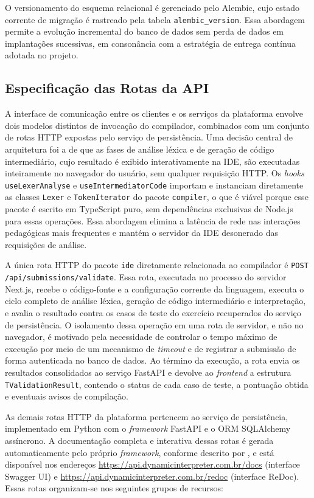 O versionamento do esquema relacional é gerenciado pelo Alembic, cujo estado corrente de migração é rastreado pela tabela \texttt{alembic\_version}. Essa abordagem permite a evolução incremental do banco de dados sem perda de dados em implantações sucessivas, em consonância com a estratégia de entrega contínua adotada no projeto.
\subsection{Especificação das Rotas da API}
\label{subsec:rotas-api}

A interface de comunicação entre os clientes e os serviços da plataforma envolve dois modelos distintos de invocação do compilador, combinados com um conjunto de rotas HTTP expostas pelo serviço de persistência. Uma decisão central de arquitetura foi a de que as fases de análise léxica e de geração de código intermediário, cujo resultado é exibido interativamente na IDE, são executadas inteiramente no navegador do usuário, sem qualquer requisição HTTP. Os \textit{hooks} \texttt{useLexerAnalyse} e \texttt{useIntermediatorCode} importam e instanciam diretamente as classes \texttt{Lexer} e \texttt{TokenIterator} do pacote \texttt{compiler}, o que é viável porque esse pacote é escrito em TypeScript puro, sem dependências exclusivas de Node.js para essas operações. Essa abordagem elimina a latência de rede nas interações pedagógicas mais frequentes e mantém o servidor da IDE desonerado das requisições de análise.

A única rota HTTP do pacote \texttt{ide} diretamente relacionada ao compilador é \texttt{POST /api/}\allowbreak\texttt{submissions/}\allowbreak\texttt{validate}. Essa rota, executada no processo do servidor Next.js, recebe o código-fonte e a configuração corrente da linguagem, executa o ciclo completo de análise léxica, geração de código intermediário e interpretação, e avalia o resultado contra os casos de teste do exercício recuperados do serviço de persistência. O isolamento dessa operação em uma rota de servidor, e não no navegador, é motivado pela necessidade de controlar o tempo máximo de execução por meio de um mecanismo de \textit{timeout} e de registrar a submissão de forma autenticada no banco de dados. Ao término da execução, a rota envia os resultados consolidados ao serviço FastAPI e devolve ao \textit{frontend} a estrutura \texttt{TValidationResult}, contendo o status de cada caso de teste, a pontuação obtida e eventuais avisos de compilação.

As demais rotas HTTP da plataforma pertencem ao serviço de persistência, implementado em Python com o \textit{framework} FastAPI e o ORM SQLAlchemy assíncrono. A documentação completa e interativa dessas rotas é gerada automaticamente pelo próprio \textit{framework}, conforme descrito por , e está disponível nos endereços \url{https://api.dynamicinterpreter.com.br/docs} (interface Swagger UI) e \url{https://api.dynamicinterpreter.com.br/redoc} (interface ReDoc). Essas rotas organizam-se nos seguintes grupos de recursos:

